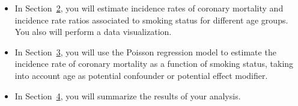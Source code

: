 \documentclass[a4paper,10pt]{article}\usepackage[]{graphicx}\usepackage[]{xcolor}
\begin{document}
\begin{itemize}

    \item In Section~\hyperref[sec:section2]{2}, you will estimate incidence rates of coronary mortality and incidence rate ratios associated to smoking status for different age groups. You also will perform a data visualization.

    \item In Section~\hyperref[sec:section3]{3}, you will use the Poisson regression model to estimate the incidence rate of coronary mortality as a function of smoking status, taking into account age as potential confounder or potential effect modifier.

    \item In Section~\hyperref[sec:section4]{4}, you will summarize the results of your analysis.

\end{itemize}
\end{document}

